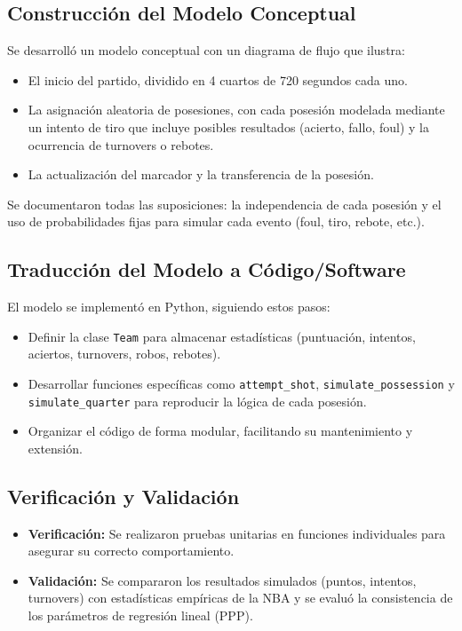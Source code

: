 \documentclass[12pt]{article}
\begin{document}
\subsection{Construcción del Modelo Conceptual}
Se desarrolló un modelo conceptual con un diagrama de flujo que ilustra:
\begin{itemize}
	\item El inicio del partido, dividido en 4 cuartos de 720 segundos cada uno.
	\item La asignación aleatoria de posesiones, con cada posesión modelada mediante un intento de tiro que incluye posibles resultados (acierto, fallo, foul) y la ocurrencia de turnovers o rebotes.
	\item La actualización del marcador y la transferencia de la posesión.
\end{itemize}
Se documentaron todas las suposiciones: la independencia de cada posesión y el uso de probabilidades fijas para simular cada evento (foul, tiro, rebote, etc.).

\subsection{Traducción del Modelo a Código/Software}
El modelo se implementó en Python, siguiendo estos pasos:
\begin{itemize}
	\item Definir la clase \texttt{Team} para almacenar estadísticas (puntuación, intentos, aciertos, turnovers, robos, rebotes).
	\item Desarrollar funciones específicas como \texttt{attempt\_shot}, \texttt{simulate\_possession} y \texttt{simulate\_quarter} para reproducir la lógica de cada posesión.
	\item Organizar el código de forma modular, facilitando su mantenimiento y extensión.
\end{itemize}

\subsection{Verificación y Validación}
\begin{itemize}
	\item \textbf{Verificación:} Se realizaron pruebas unitarias en funciones individuales para asegurar su correcto comportamiento.
	\item \textbf{Validación:} Se compararon los resultados simulados (puntos, intentos, turnovers) con estadísticas empíricas de la NBA y se evaluó la consistencia de los parámetros de regresión lineal (PPP).
\end{itemize}
\end{document}

